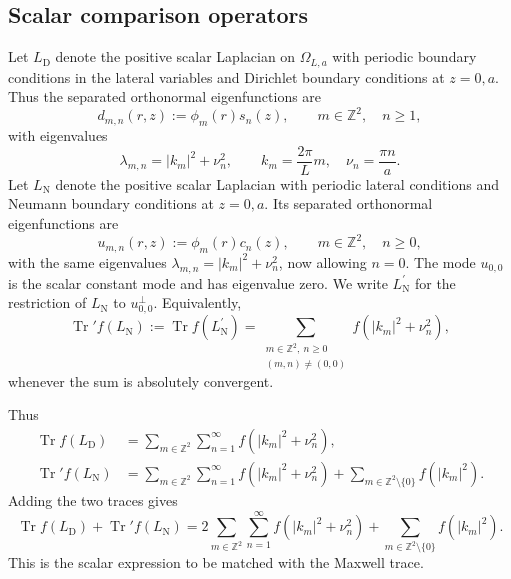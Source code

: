 \documentclass[11pt]{article}
\providecommand{\Z}{\mathbb{Z}}
\providecommand{\Tr}{\operatorname{Tr}}
\providecommand{\abs}[1]{\left\lvert #1\right\rvert}
\providecommand{\paren}[1]{\left(#1\right)}
\providecommand{\OmegaLa}{\Omega_{L,a}}
\providecommand{\LD}{L_{\mathrm D}}
\providecommand{\LN}{L_{\mathrm N}}
\providecommand{\LNp}{L_{\mathrm N}^{\prime}}
\providecommand{\lambdamn}{\lambda_{m,n}}
\providecommand{\phim}{\phi_m}
\providecommand{\sn}{s_n}
\providecommand{\cn}{c_n}
\numberwithin{equation}{section}
\begin{document}
\subsection{Scalar comparison operators}
\label{subsec:scalar-comparison-operators}

Let \(\LD\) denote the positive scalar Laplacian on \(\OmegaLa\) with periodic
boundary conditions in the lateral variables and Dirichlet boundary conditions
at \(z=0,a\).  Thus the separated orthonormal eigenfunctions are
\begin{equation}
    d_{m,n}(r,z):=\phim(r)\sn(z),
    \qquad
    m\in\Z^2,
    \quad n\geq1,
    \label{eq:dirichlet-scalar-eigenfunctions}
\end{equation}
with eigenvalues
\begin{equation}
    \lambdamn
    =
    \abs{k_m}^2+\nu_n^2,
    \qquad
    k_m=\frac{2\pi}{L}m,
    \quad
    \nu_n=\frac{\pi n}{a} .
    \label{eq:scalar-lambda-mn-section05}
\end{equation}
Let \(\LN\) denote the positive scalar Laplacian with periodic lateral
conditions and Neumann boundary conditions at \(z=0,a\).  Its separated
orthonormal eigenfunctions are
\begin{equation}
    u_{m,n}(r,z):=\phim(r)\cn(z),
    \qquad
    m\in\Z^2,
    \quad n\geq0,
    \label{eq:neumann-scalar-eigenfunctions}
\end{equation}
with the same eigenvalues \(\lambdamn=\abs{k_m}^2+\nu_n^2\), now allowing
\(n=0\).  The mode \(u_{0,0}\) is the scalar constant mode and has eigenvalue
zero.  We write \(\LNp\) for the restriction of \(\LN\) to
\(u_{0,0}^{\perp}\).  Equivalently,
\begin{equation}
    \Tr' f(\LN)
    :=
    \Tr f(\LNp)
    =
    \sum_{\substack{m\in\Z^2,\ n\geq0\\ (m,n)\ne(0,0)}}
    f\paren{\abs{k_m}^2+\nu_n^2},
    \label{eq:prime-neumann-trace-def-section05}
\end{equation}
whenever the sum is absolutely convergent.

Thus
\begin{align}
    \Tr f(\LD)
    &=
    \sum_{m\in\Z^2}\sum_{n=1}^{\infty}
    f\paren{\abs{k_m}^2+\nu_n^2},
    \label{eq:dirichlet-trace-section05}\\
    \Tr' f(\LN)
    &=
    \sum_{m\in\Z^2}\sum_{n=1}^{\infty}
    f\paren{\abs{k_m}^2+\nu_n^2}
    +
    \sum_{m\in\Z^2\setminus\{0\}}
    f\paren{\abs{k_m}^2}.
    \label{eq:neumann-prime-trace-section05}
\end{align}
Adding the two traces gives
\begin{equation}
    \Tr f(\LD)+\Tr' f(\LN)
    =
    2\sum_{m\in\Z^2}\sum_{n=1}^{\infty}
    f\paren{\abs{k_m}^2+\nu_n^2}
    +
    \sum_{m\in\Z^2\setminus\{0\}}
    f\paren{\abs{k_m}^2} .
    \label{eq:LD-plus-LNp-trace-expanded}
\end{equation}
This is the scalar expression to be matched with the Maxwell trace.
\end{document}
